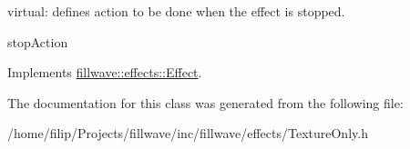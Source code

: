 virtual\+: defines action to be done when the effect is stopped. 

stop\+Action 

Implements \hyperlink{classfillwave_1_1effects_1_1Effect_aed8c053b5798cbbc6668117989d18ead}{fillwave\+::effects\+::\+Effect}.



The documentation for this class was generated from the following file\+:\begin{DoxyCompactItemize}
\item 
/home/filip/\+Projects/fillwave/inc/fillwave/effects/Texture\+Only.\+h\end{DoxyCompactItemize}
